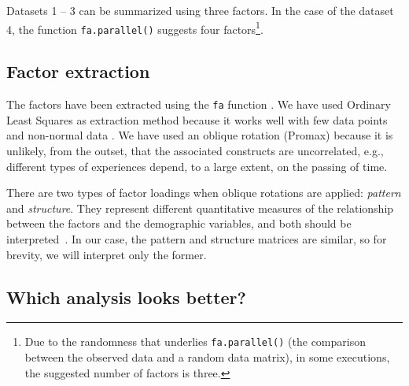 \documentclass[10pt,conference]{IEEEtran}\usepackage[]{graphicx}\usepackage[table,xcdraw]{xcolor}
\begin{document}
Datasets 1 -- 3 can be summarized using three factors. In the case of the dataset 4, the function \lstinline{fa.parallel()} suggests four factors\footnote{Due to the randomness that underlies \lstinline{fa.parallel()} (the comparison between the observed data and a random data matrix), in some executions, the suggested number of factors is three.}.

\subsection{Factor extraction}

The factors have been extracted using the \lstinline{fa} function \cite{psych}. We have used Ordinary Least Squares as extraction method because it works well with few data points and non-normal data \cite[Chapter 11]{watkins2020step}. We have used an oblique rotation (Promax) because it is unlikely, from the outset, that the associated constructs are uncorrelated, e.g., different types of experiences depend, to a large extent, on the passing of time. 

There are two types of factor loadings when oblique rotations are applied: \textit{pattern} and \textit{structure}. They represent different quantitative measures of the relationship between the factors and the demographic variables, and both should be interpreted~\cite[Chapter 13]{watkins2020step}. In our case, the pattern and structure matrices are similar, so for brevity, we will interpret only the former. 

\subsection{Which analysis looks better?}
\end{document}
